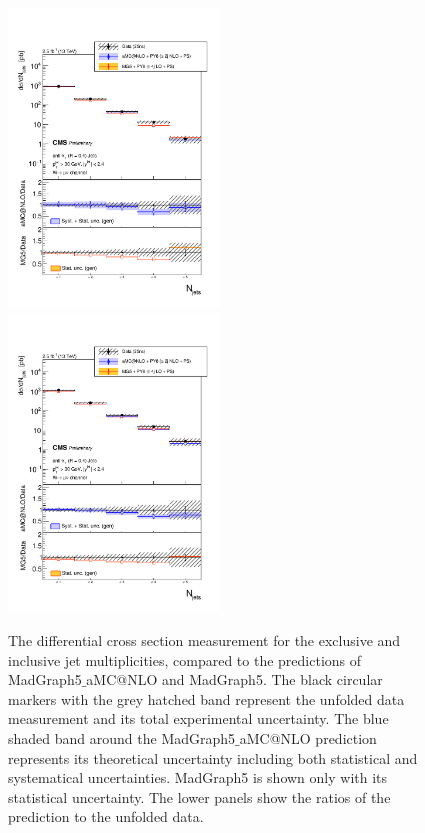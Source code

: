 \documentclass[oneside, letterpaper, oldfontcommands]{memoir}
\begin{document}
\begin{table}
\begin{figure}[hp]
    \includegraphics[width=0.5\textwidth]{SMu_unfolded_ZNGoodJetsFull_Zexc_Bayes_JetPtMin_30_JetEtaMax_24_MGPYTHIA6_.pdf}
    \includegraphics[width=0.5\textwidth]{SMu_unfolded_ZNGoodJetsFull_Zinc_Bayes_JetPtMin_30_JetEtaMax_24_MGPYTHIA6_.pdf}
    \caption{The differential cross section measurement for the exclusive and inclusive jet multiplicities, compared to the predictions of {\sc MadGraph5$\_$aMC@NLO} and {\sc MadGraph}5. The black circular markers with the grey hatched band represent the unfolded data measurement and its total experimental uncertainty. The blue shaded band around the {\sc MadGraph5$\_$aMC@NLO} prediction represents its theoretical uncertainty including both statistical and systematical uncertainties. {\sc MadGraph5} is shown only with its statistical uncertainty. The lower panels show the ratios of the prediction to the unfolded data.}
    \label{fig:xsec_Njets_nlo}
\end{figure}



\end{table}
\end{document}
